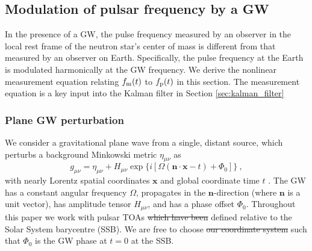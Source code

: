 \documentclass[fleqn,usenatbib,useAMS]{mnras}
\providecommand{\DIFadd}[1]{{\protect\color{blue}\uwave{#1}}} %
\providecommand{\DIFdel}[1]{{\protect\color{red}\sout{#1}}}                      %
\providecommand{\DIFaddbegin}{} %
\providecommand{\DIFaddend}{} %
\providecommand{\DIFdelbegin}{} %
\providecommand{\DIFdelend}{} %
\newcommand{\DIFscaledelfig}{0.5}
\newlength{\DIFdelgraphicswidth} %
\newlength{\DIFdelgraphicsheight} %
\newcommand{\DIFaddincludegraphics}[2][]{{\color{blue}\fbox{\DIFOincludegraphics[#1]{#2}}}} %
\newcommand{\DIFdelincludegraphics}[2][]{%
\sbox{\DIFdelgraphicsbox}{\DIFOincludegraphics[#1]{#2}}%
\settoboxwidth{\DIFdelgraphicswidth}{\DIFdelgraphicsbox} %
\settoboxtotalheight{\DIFdelgraphicsheight}{\DIFdelgraphicsbox} %
\scalebox{\DIFscaledelfig}{%
\parbox[b]{\DIFdelgraphicswidth}{\usebox{\DIFdelgraphicsbox}\\[-\baselineskip] \rule{\DIFdelgraphicswidth}{0em}}\llap{\resizebox{\DIFdelgraphicswidth}{\DIFdelgraphicsheight}{%
\setlength{\unitlength}{\DIFdelgraphicswidth}%
\begin{picture}(1,1)%
\thicklines\linethickness{2pt} %
{\color[rgb]{1,0,0}\put(0,0){\framebox(1,1){}}}%
{\color[rgb]{1,0,0}\put(0,0){\line( 1,1){1}}}%
{\color[rgb]{1,0,0}\put(0,1){\line(1,-1){1}}}%
\end{picture}%
}\hspace*{3pt}}} %
} %
\DeclareRobustCommand{\DIFaddbegin}{\DIFOaddbegin \let\includegraphics\DIFaddincludegraphics} %
\DeclareRobustCommand{\DIFaddend}{\DIFOaddend \let\includegraphics\DIFOincludegraphics} %
\DeclareRobustCommand{\DIFdelbegin}{\DIFOdelbegin \let\includegraphics\DIFdelincludegraphics} %
\DeclareRobustCommand{\DIFdelend}{\DIFOaddend \let\includegraphics\DIFOincludegraphics} %
\begin{document}
\subsection{Modulation of pulsar frequency by a GW} \label{sec:psr_measured}
In the presence of a GW, the pulse frequency measured by an observer in the local rest frame of the neutron star's center of mass is different from that measured by an observer on Earth. Specifically, the pulse frequency at the Earth is modulated harmonically at the GW frequency. We derive the nonlinear measurement equation relating $f_{\rm m}(t)$ to $f_{\rm p}(t)$ in this section. The measurement equation is a key input into the Kalman filter in Section \ref{sec:kalman_filter}
\subsubsection{Plane GW perturbation}\label{sec:plane_gw}
We consider a gravitational plane wave from a single, distant source, which perturbs a background Minkowski metric $\eta_{\mu \nu}$ as
\begin{equation}
	g_{\mu \nu} = \eta_{\mu \nu} + H_{\mu \nu} \exp{ \{ i[\Omega(\boldsymbol{n} \cdot \boldsymbol{x} - t) + \Phi_0] \} } \ ,
\end{equation}
with nearly Lorentz spatial coordinates $\boldsymbol{x}$ and global coordinate time $t$ \citep{schutz2022}. The GW has a constant angular frequency $\Omega$, propagates in the $\boldsymbol{n}$-direction (where $\boldsymbol{n}$ is a unit vector), has amplitude tensor $H_{\mu \nu}$, and has a phase offset  $\Phi_0$. Throughout this paper we work with pulsar TOAs \DIFdelbegin \DIFdel{which have been }\DIFdelend defined relative to the Solar System barycentre (SSB). We are free to choose \DIFdelbegin \DIFdel{our coordinate system }\DIFdelend \DIFaddbegin \DIFadd{coordinates }\DIFaddend such that $\Phi_0$ is the GW phase at $t=0$ at the SSB. \newline 
\end{document}
